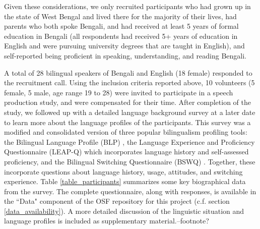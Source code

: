 \documentclass[12 pt]{article}
\begin{document}
Given these considerations, we only recruited participants who had grown up in the state of West Bengal and lived there for the majority of their lives, had parents who both spoke Bengali, and had received at least 5 years of formal education in Bengali (all respondents had received 5+ years of education in English and were pursuing university degrees that are taught in English), and self-reported being proficient in speaking, understanding, and reading Bengali. 
   
A total of 28 bilingual speakers of Bengali and English (18 female) responded to the recruitment call. Using the inclusion criteria reported above, 10 volunteers (5 female, 5 male, age range 19 to 28) were invited to participate in a speech production study, and were compensated for their time. After completion of the study, we followed up with a detailed language background survey at a later date to learn more about the language profiles of the participants. This survey was a modified and consolidated version of three popular bilingualism profiling tools: the Bilingual Language Profile (BLP) \citep{blp}, the Language Experience and Proficiency Questionnaire (LEAP-Q) \citep{leap-q} which incorporates language history and self-assessed proficiency, and the Bilingual Switching Questionnaire (BSWQ) \citep{language_switching_questionnaire}. Together, these incorporate questions about language history, usage, attitudes, and switching experience. Table \ref{table_participants} summarizes some key biographical data from the survey. \alert{The complete questionnaire, along with responses, is available in the ``Data" component of the OSF repository for this project (c.f. section \ref{data_availability}). A more detailed discussion of the linguistic situation and language profiles is included as supplementary material.--footnote?}
\end{document}
